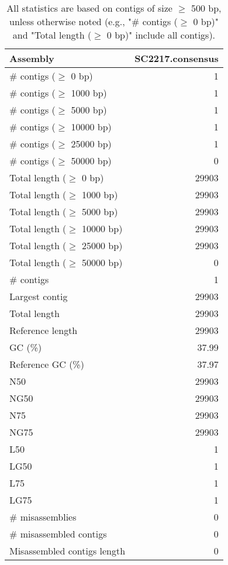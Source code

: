 \documentclass[12pt,a4paper]{article}
\begin{document}
\begin{table}[ht]
\begin{center}
\caption{All statistics are based on contigs of size $\geq$ 500 bp, unless otherwise noted (e.g., "\# contigs ($\geq$ 0 bp)" and "Total length ($\geq$ 0 bp)" include all contigs).}
\begin{tabular}{|l*{1}{|r}|}
\hline
Assembly & SC2217.consensus \\ \hline
\# contigs ($\geq$ 0 bp) & 1 \\ \hline
\# contigs ($\geq$ 1000 bp) & 1 \\ \hline
\# contigs ($\geq$ 5000 bp) & 1 \\ \hline
\# contigs ($\geq$ 10000 bp) & 1 \\ \hline
\# contigs ($\geq$ 25000 bp) & 1 \\ \hline
\# contigs ($\geq$ 50000 bp) & 0 \\ \hline
Total length ($\geq$ 0 bp) & 29903 \\ \hline
Total length ($\geq$ 1000 bp) & 29903 \\ \hline
Total length ($\geq$ 5000 bp) & 29903 \\ \hline
Total length ($\geq$ 10000 bp) & 29903 \\ \hline
Total length ($\geq$ 25000 bp) & 29903 \\ \hline
Total length ($\geq$ 50000 bp) & 0 \\ \hline
\# contigs & 1 \\ \hline
Largest contig & 29903 \\ \hline
Total length & 29903 \\ \hline
Reference length & 29903 \\ \hline
GC (\%) & 37.99 \\ \hline
Reference GC (\%) & 37.97 \\ \hline
N50 & 29903 \\ \hline
NG50 & 29903 \\ \hline
N75 & 29903 \\ \hline
NG75 & 29903 \\ \hline
L50 & 1 \\ \hline
LG50 & 1 \\ \hline
L75 & 1 \\ \hline
LG75 & 1 \\ \hline
\# misassemblies & 0 \\ \hline
\# misassembled contigs & 0 \\ \hline
Misassembled contigs length & 0 \\ \hline

\end{tabular}
\end{center}
\end{table}
\end{document}
